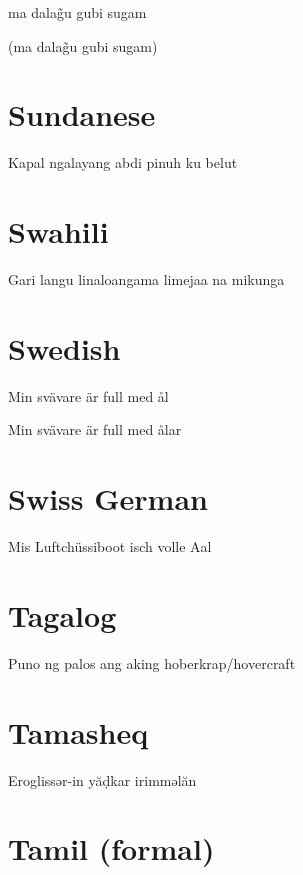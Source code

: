 \documentclass{article}
\begin{document}
ma dalag̃u gubi sugam

\noindent
(ma dalag̃u gubi sugam)
\section{Sundanese}

Kapal ngalayang abdi pinuh ku belut

\section{Swahili}

Gari langu linaloangama limejaa na mikunga

\section{Swedish}

Min svävare är full med ål

\noindent
Min svävare är full med ålar

\section{Swiss German}

Mis Luftchüssiboot isch volle Aal




\section{Tagalog}

Puno ng palos ang aking hoberkrap/hovercraft

\section{Tamasheq}

Eroglissər-in yăḍkar irimməlăn

\section{Tamil (formal)}
\end{document}

